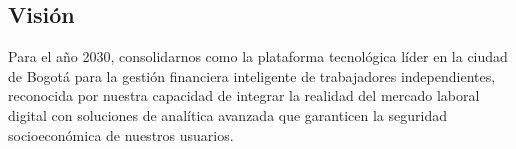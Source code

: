 \subsection*{Visión}
Para el año 2030, consolidarnos como la plataforma tecnológica líder en la ciudad de Bogotá para la gestión financiera inteligente de trabajadores independientes, reconocida por nuestra capacidad de integrar la realidad del mercado laboral digital con soluciones de analítica avanzada que garanticen la seguridad socioeconómica de nuestros usuarios.